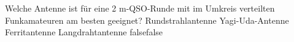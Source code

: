     {Welche Antenne ist für eine 2 m-QSO-Runde mit im Umkreis verteilten Funkamateuren am besten geeignet?}
    {Rundstrahlantenne}
    {Yagi-Uda-Antenne}
    {Ferritantenne}
    {Langdrahtantenne}
    {false}{false}